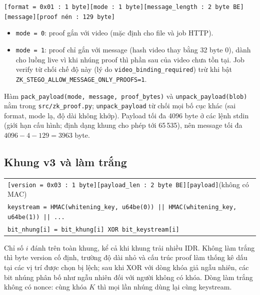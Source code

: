 \documentclass[11pt,a4paper]{article}
\begin{document}
\begin{center}
\small
\texttt{[format = 0x01 : 1 byte][mode : 1 byte][message\_length : 2 byte BE][message][proof nén : 129 byte]}
\end{center}

\begin{itemize}[leftmargin=*]
  \item \texttt{mode = 0}: proof gắn với video (mặc định cho file và job HTTP).
  \item \texttt{mode = 1}: proof chỉ gắn với message (hash video thay bằng 32 byte 0),
  dành cho luồng live vì khi nhúng proof thì phần sau của video chưa tồn tại. Job verify
  từ chối chế độ này (lý do \texttt{video\_binding\_required}) trừ khi bật
  \texttt{ZK\_STEGO\_ALLOW\_MESSAGE\_ONLY\_PROOFS=1}.
\end{itemize}

Hàm \texttt{pack\_payload(mode, message, proof\_bytes)} và \texttt{unpack\_payload(blob)}
nằm trong \texttt{src/zk\_proof.py}; \texttt{unpack\_payload} từ chối mọi bố cục khác
(sai format, mode lạ, độ dài không khớp). Payload tối đa 4096 byte ở các lệnh stdin
(giới hạn cấu hình; định dạng khung cho phép tới 65\,535), nên message tối đa
\(4096 - 4 - 129 = 3963\) byte.

\subsection{Khung v3 và làm trắng}
\label{sec:frame}

\begin{center}
\footnotesize
\begin{tabular}{l}
\texttt{[version = 0x03 : 1 byte][payload\_len : 2 byte BE][payload]}\quad (không có MAC) \\[3pt]
\texttt{keystream = HMAC(whitening\_key, u64be(0)) || HMAC(whitening\_key, u64be(1)) || ...} \\
\texttt{bit\_nhung[i] = bit\_khung[i] XOR bit\_keystream[i]} \\
\end{tabular}
\end{center}

Chỉ số \(i\) đánh trên toàn khung, kể cả khi khung trải nhiều IDR. Không làm trắng
thì byte version cố định, trường độ dài nhỏ và cấu trúc proof làm thống kê dấu tại
các vị trí được chọn bị lệch; sau khi XOR với dòng khóa giả ngẫu nhiên, các bit
nhúng phân bố như ngẫu nhiên đối với người không có khóa. Dòng làm trắng không có
nonce: cùng khóa \(K\) thì mọi lần nhúng dùng lại cùng keystream.
\end{document}
